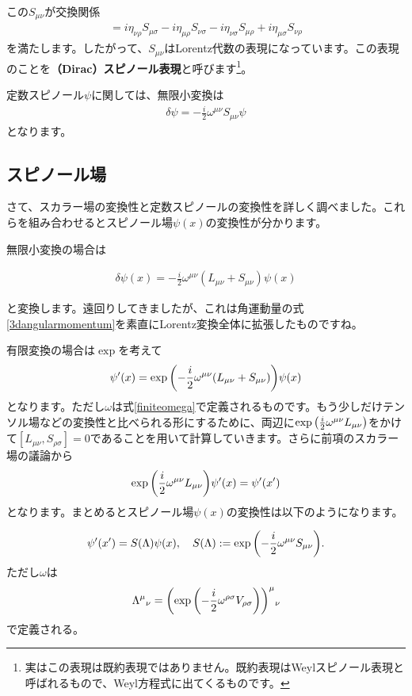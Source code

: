 \documentclass[report,paper=a4, fontsize=12pt, line_length=16cm, number_of_lines=33,dvipdfmx]{jlreq}
\newenvironment{important}{\begin{tcolorbox}[
  colback = white,
  colframe = red!35,
  boxrule = 2mm,
  fonttitle = \bfseries,
  after = \noindent] }{\end{tcolorbox}}
\numberwithin{equation}{chapter}
\newcommand{\strong}[1]{{\sffamily \bfseries #1}}
\begin{document}
この$S_{\mu\nu}$が交換関係
\begin{align}
  [S_{\mu\nu},S_{\rho\sigma}]=
  i\eta_{\nu\rho}S_{\mu\sigma}
  -i\eta_{\mu\rho}S_{\nu\sigma}
  -i\eta_{\nu\sigma}S_{\mu\rho}
  +i\eta_{\mu\sigma}S_{\nu\rho}
\end{align}
を満たします。したがって、$S_{\mu\nu}$はLorentz代数の表現になっています。この表現のことを\strong{（Dirac）スピノール表現}と呼びます\footnote{実はこの表現は既約表現ではありません。既約表現はWeylスピノール表現と呼ばれるもので、Weyl方程式に出てくるものです。}。

定数スピノール$\psi$に関しては、無限小変換は
\begin{align}
  \delta \psi=-\frac{i}{2}\omega^{\mu\nu}S_{\mu\nu}\psi
\end{align}
となります。

\subsection{スピノール場}
さて、スカラー場の変換性と定数スピノールの変換性を詳しく調べました。これらを組み合わせるとスピノール場$\psi(x)$の変換性が分かります。

無限小変換の場合は
\begin{important}
  \begin{align}
    \delta \psi(x)=-\frac{i}{2}\omega^{\mu\nu}(L_{\mu\nu}+S_{\mu\nu})\psi(x)\label{spinortransformationinfinitesimal}
  \end{align}  
\end{important}
と変換します。遠回りしてきましたが、これは角運動量の式\eqref{3dangularmomentum}を素直にLorentz変換全体に拡張したものですね。

有限変換の場合は$\exp$を考えて
\begin{align}
  \psi'(x)=\exp\qty(-\frac{i}{2}\omega^{\mu\nu}(L_{\mu\nu}+S_{\mu\nu}))\psi(x)
\end{align}
となります。ただし$\omega$は式\eqref{finiteomega}で定義されるものです。もう少しだけテンソル場などの変換性と比べられる形にするために、両辺に$\exp\qty(\frac{i}{2}\omega^{\mu\nu}L_{\mu\nu})$をかけて$[L_{\mu\nu},S_{\rho\sigma}]=0$であることを用いて計算していきます。さらに前項のスカラー場の議論から
\begin{align}
  \exp\qty(\frac{i}{2}\omega^{\mu\nu}L_{\mu\nu})\psi'(x)=\psi'(x')
\end{align}
となります。まとめるとスピノール場$\psi(x)$の変換性は以下のようになります。
\begin{important}
  \begin{align}
    \psi'(x')=S(\Lambda)\psi(x),\quad
    S(\Lambda):=\exp\qty(-\frac{i}{2}\omega^{\mu\nu}S_{\mu\nu}).\label{spinortransformation}
  \end{align}
  ただし$\omega$は
  \begin{align}
    \Lambda^{\mu}{}_{\nu}=\qty(\exp\qty(-\frac{i}{2}\omega^{\rho\sigma}V_{\rho\sigma}))^{\mu}{}_{\nu}
  \end{align}
  で定義される。
\end{important}
\end{document}
